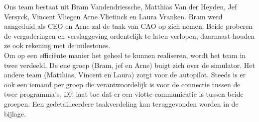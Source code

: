 \documentclass{peno-opdracht1}
\begin{document}
\maketitle

Ons team bestaat uit Bram Vandendriessche, Matthias Van der Heyden, Jef Versyck, Vincent Vliegen Arne Vlietinck en Laura Vranken. Bram werd aangeduid als CEO en Arne zal de taak van CAO op zich nemen. Beide proberen de vergaderingen en verslaggeving ordentelijk te laten verlopen, daarnaast houden ze ook rekening met de milestones. \\
Om op een effici\"ente manier het geheel te kunnen realiseren, wordt het team in twee verdeeld. De ene groep (Bram, jef en Arne) buigt zich over de simulator. Het andere team  (Matthias, Vincent en Laura) zorgt voor de autopilot. Steeds is er ook een iemand per groep die verantwoordelijk is voor de connectie tussen de twee programma's. Dit laat toe dat er een vlotte communicatie is tussen beide groepen.
Een gedetailleerdere taakverdeling kan teruggevonden worden in de bijlage.


\begin{comment}
	Na de eerste volledige sessie wordt max. 2 pagina's verwacht. Beschrijf op een zeer hoog
	niveau wat je gaat realiseren, hoe je ontwerp er verwacht wordt uit te zien, een ruwe schets
	van de planning en geef de verantwoordelijkheden die daar aan gekoppeld zijn weer. Al
	het belangrijke van jullie eerste brainstormsessie zou hierin vermeld moeten zijn. De tekst
	wordt geacht op een bladzijde te passen, en bijhorend wordt er een schets/tabel/figuur
	verwacht die duiding geeft bij een bepaald aspect uit deze tekst.
	
	\emph{Deadline:11/10/2016 voor 24u. Insturen per mail naar begeleider(s)}
	\newline
	\newline
	
	Brainstorming: 
	\begin{enumerate}
	
	\item Voorstellen drone: balk om de botsingen te dekken. Massamiddelpunt centrum. Hoogte drone defini\"eren (fysische eigenschappen verder uitwerken). 
	\item Simulator: grondopp, display wit, rode bol, zwaartekracht dus hierdoor kennis vn de grondopp.
	\newline
	\item Dieptezicht
	\item Gekregen Javacode analyseren
	\item Punt van de twee camera's vastleggen. Hieruit volgen dan de berekenen.
	\item RPY-hoeken 
	\item Hoe pixels omzetten nr beeld? Veel van te vinden online.
	\item Eigenschappen van de drone? (vrij te kiezen?)
	\item Hoe afgaan op de pixels van de bol? 
	
	\end{enumerate}
\end{comment}
	
\end{document}
